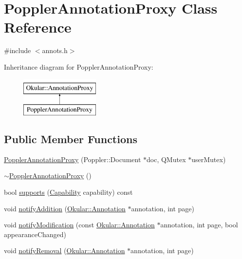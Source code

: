 \hypertarget{classPopplerAnnotationProxy}{\section{Poppler\+Annotation\+Proxy Class Reference}
\label{classPopplerAnnotationProxy}
}


{\ttfamily \#include $<$annots.\+h$>$}

Inheritance diagram for Poppler\+Annotation\+Proxy\+:\begin{figure}[H]
\begin{center}
\leavevmode
\includegraphics[height=2.000000cm]{classPopplerAnnotationProxy}
\end{center}
\end{figure}
\subsection*{Public Member Functions}
\begin{DoxyCompactItemize}
\item 
\hyperlink{classPopplerAnnotationProxy_a034cb9d9a9515e196df3b3a295ba8a9b}{Poppler\+Annotation\+Proxy} (Poppler\+::\+Document $\ast$doc, Q\+Mutex $\ast$user\+Mutex)
\item 
\hyperlink{classPopplerAnnotationProxy_a28b2999c1e021317e4f6e085863440fe}{$\sim$\+Poppler\+Annotation\+Proxy} ()
\item 
bool \hyperlink{classPopplerAnnotationProxy_a1c76a27f5bdcae079ac6cc389d790a4a}{supports} (\hyperlink{classOkular_1_1AnnotationProxy_ae89e16435aa7e10ac4089e673f44e543}{Capability} capability) const 
\item 
void \hyperlink{classPopplerAnnotationProxy_aebfb359939745a4031b0e32a536ad306}{notify\+Addition} (\hyperlink{classOkular_1_1Annotation}{Okular\+::\+Annotation} $\ast$annotation, int page)
\item 
void \hyperlink{classPopplerAnnotationProxy_a24570660843c85dd702d9cf743cb6c79}{notify\+Modification} (const \hyperlink{classOkular_1_1Annotation}{Okular\+::\+Annotation} $\ast$annotation, int page, bool appearance\+Changed)
\item 
void \hyperlink{classPopplerAnnotationProxy_a476bb44d9f52463bb445322ec2fc436f}{notify\+Removal} (\hyperlink{classOkular_1_1Annotation}{Okular\+::\+Annotation} $\ast$annotation, int page)
\end{DoxyCompactItemize}
